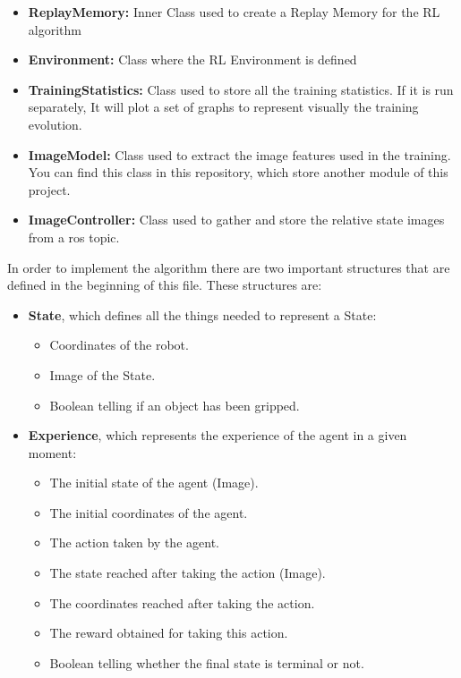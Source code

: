 \begin{itemize}
					\item[\textendash]\textbf{ReplayMemory:} Inner Class used to create a Replay Memory for the RL algorithm
					\item[\textendash]\textbf{Environment:} Class where the RL Environment is defined
					\item[\textendash]\textbf{TrainingStatistics:} Class used to store all the training statistics. If it is run separately, It will plot a set of graphs to represent visually the training evolution.
					\item[\textendash]\textbf{ImageModel:} Class used to extract the image features used in the training. You can find this class in this repository, which store another module of this project.
					\item[\textendash]\textbf{ImageController:} Class used to gather and store the relative state images from a ros topic.
				\end{itemize}
				
				In order to implement the algorithm there are two important structures that are defined in the beginning of this file. These structures are:
				
				\begin{itemize}
					\item[\textendash]\textbf{State}, which defines all the things needed to represent a State:
					\begin{itemize}
						\item[\textendash]Coordinates of the robot.
						\item[\textendash]Image of the State. 
						\item[\textendash]Boolean telling if an object has been gripped.
					\end{itemize}
					\item[\textendash]\textbf{Experience}, which represents the experience of the agent in a given moment:
					\begin{itemize}
						\item[\textendash]The initial state of the agent (Image).
						\item[\textendash]The initial coordinates of the agent.
						\item[\textendash]The action taken by the agent.						
						\item[\textendash]The state reached after taking the action (Image).
						\item[\textendash]The coordinates reached after taking the action.
						\item[\textendash]The reward obtained for taking this action.
						\item[\textendash]Boolean telling whether the final state is terminal or not.
					\end{itemize}
				\end{itemize}
			
